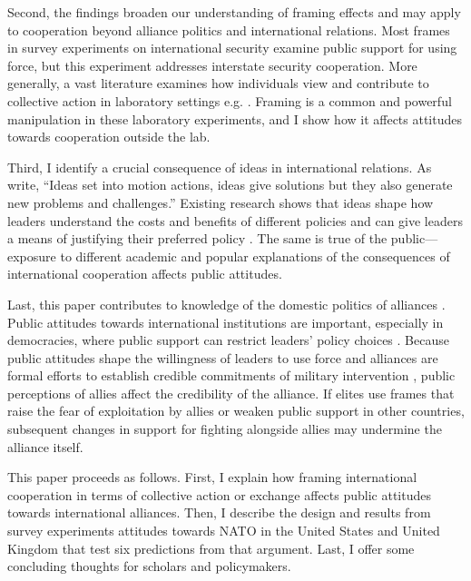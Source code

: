 \documentclass[12pt]{article}
\begin{document}
Second, the findings broaden our understanding of framing effects and may apply to cooperation beyond alliance politics and international relations.  
Most frames in survey experiments on international security examine public support for using force, but this experiment addresses interstate security cooperation. 
More generally, a vast literature examines how individuals view and contribute to collective action in laboratory settings e.g. \citep{Ostrometal1992, GachterFehr1999, Houseretal2008, Aimoneetal2013}. 
Framing is a common and powerful manipulation in these laboratory experiments, and I show how it affects attitudes towards cooperation outside the lab. 


Third, I identify a crucial consequence of ideas in international relations. 
As \citet[pg. 50]{BoettkeAligica2009} write, ``Ideas set into motion actions, ideas give solutions but they also generate new problems and challenges.''
Existing research shows that ideas shape how leaders understand the costs and benefits of different policies \citep{Morrison2012, Morrison2016} and can give leaders a means of justifying their preferred policy \citep{Parsons2002}.
The same is true of the public--- exposure to different academic and popular explanations of the consequences of international cooperation affects public attitudes.


Last, this paper contributes to knowledge of the domestic politics of alliances \citep{Lobell2004, Mattes2012a}.
Public attitudes towards international institutions are important, especially in democracies, where public support can restrict leaders' policy choices \citep{Putnam1988, Fearon1998, LevenduskyHorowitz2012, Williams2013, Levyetal2015}. 
Because public attitudes shape the willingness of leaders to use force \citep{Tomzetal2020} and alliances are formal efforts to establish credible commitments of military intervention \citep{Morrow2000}, public perceptions of allies affect the credibility of the alliance. 
If elites use frames that raise the fear of exploitation by allies or weaken public support in other countries, subsequent changes in support for fighting alongside allies may undermine the alliance itself.  


This paper proceeds as follows. 
First, I explain how framing international cooperation in terms of collective action or exchange affects public attitudes towards international alliances. 
Then, I describe the design and results from survey experiments attitudes towards NATO in the United States and United Kingdom that test six predictions from that argument. 
Last, I offer some concluding thoughts for scholars and policymakers. 
\end{document}
